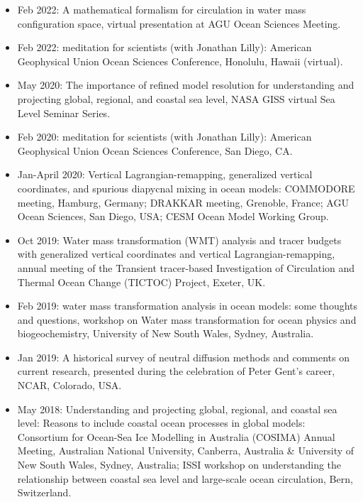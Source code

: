 \begin{itemize}[leftmargin=*]
\item Feb 2022: {\sc A mathematical formalism for circulation in water mass configuration space}, virtual presentation at AGU Ocean Sciences Meeting.

\item Feb 2022: {\sc meditation for scientists} (with Jonathan Lilly): {\sc American Geophysical Union Ocean Sciences Conference}, Honolulu, Hawaii (virtual).

\item May 2020: {\sc The importance of refined model resolution for understanding and projecting global, regional, and coastal sea level}, NASA GISS virtual Sea Level Seminar Series. 

\item Feb 2020: {\sc meditation for scientists} (with Jonathan Lilly): {\sc American Geophysical Union Ocean Sciences Conference}, San Diego, CA. 

\item Jan-April 2020: {\sc Vertical Lagrangian-remapping, generalized vertical coordinates, and spurious diapycnal mixing in ocean
  models}: COMMODORE meeting, Hamburg, Germany; DRAKKAR meeting, Grenoble, France; AGU Ocean Sciences, San Diego, USA; CESM Ocean Model Working Group.  

\item Oct 2019: {\sc Water mass transformation (WMT) analysis
  and tracer budgets with generalized vertical coordinates and vertical Lagrangian-remapping}, annual meeting of the Transient tracer-based Investigation of Circulation and Thermal Ocean Change (TICTOC) Project, Exeter, UK.

\item Feb 2019: {\sc water mass transformation analysis in ocean models: some thoughts and questions}, workshop on Water mass transformation for ocean physics and biogeochemistry, University of New South Wales, Sydney, Australia.  

\item Jan 2019: {\sc A historical survey of neutral diffusion methods and comments on current research}, presented during the celebration of Peter Gent's career, NCAR, Colorado, USA.  

\item May 2018: {\sc Understanding and projecting global, regional, and coastal sea level: Reasons to include coastal ocean processes in global models}: Consortium for Ocean-Sea Ice Modelling in Australia (COSIMA) Annual Meeting, Australian National University, Canberra, Australia \& University of New South Wales, Sydney, Australia; ISSI workshop on understanding the relationship between coastal sea level and large-scale ocean circulation, Bern, Switzerland. 


\end{itemize}
